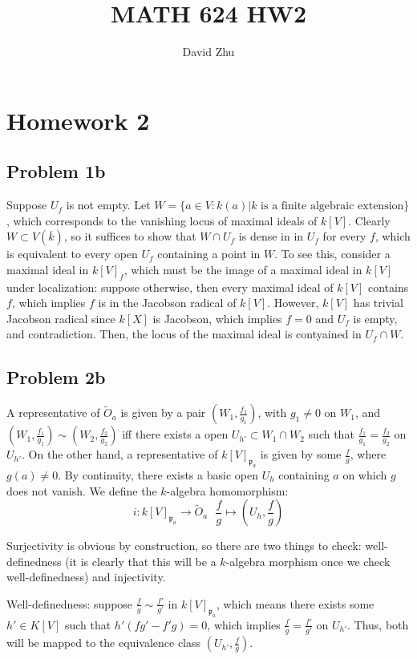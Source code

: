 \documentclass{article}
\title{MATH 624 HW2}
\author{David Zhu}
\theoremstyle{definition}
\theoremstyle{definition}
\theoremstyle{definition}
\theoremstyle{definition}
\theoremstyle{definition}
\theoremstyle{definition}
\theoremstyle{definition}
\begin{document}
\maketitle

\section*{Homework 2}

\subsection*{Problem 1b}
Suppose $U_f$ is not empty. Let $W=\{ a\in V: k(a)|k \textrm{ is a finite algebraic extension} \}$, which corresponds to the vanishing locus of maximal ideals of $k[V]$. Clearly $W\subset V(\overline{k})$, so it suffices to show that $W\cap U_f$ is dense in in $U_f$ for every $f$, which is equivalent to every open $U_f$ containing a point in $W$. To see this, consider a maximal ideal in $k[V]_f$, which must be the image of a maximal ideal in $k[V]$ under localization: suppose otherwise, then every maximal ideal of $k[V]$ contains $f$, which implies $f$ is in the Jacobson radical of $k[V]$. However, $k[V]$ has trivial Jacobson radical since $k[X]$ is Jacobson, which implies $f=0$ and $U_f$ is empty, and contradiction. Then, the locus of the maximal ideal is contyained in $U_f\cap W$.


\subsection*{Problem 2b}
A representative of $\tilde{O}_a$ is given by a pair $(W_1, \frac{f_1}{g_1})$, with $g_1\neq 0$ on $W_1$, and $(W_1, \frac{f_1}{g_1})\sim (W_2, \frac{f_2}{g_2})$ iff there exists a open $U_{h'}\subset W_1\cap W_2$ such that $\frac{f_1}{g_1}=\frac{f_2}{g_2}$ on $U_{h'}$. On the other hand, a representative of $k[V]_{\mathfrak{p}_a}$ is given by some $\frac{f}{g}$, where $g(a)\neq 0$. By continuity, there exists a basic open $U_h$ containing $a$ on which $g$ does not vanish. We define the $k$-algebra homomorphism: 
\[i: k[V]_{\mathfrak{p}_a}\to \tilde{O}_a  \ \ \ \frac{f}{g}\mapsto (U_h, \frac{f}{g})\]

Surjectivity is obvious by construction, so there are two things to check: well-definedness (it is clearly that this will be a $k$-algebra morphism once we check well-definedness) and injectivity.

Well-definedness: suppose $\frac{f}{g}\sim \frac{f'}{g'}$ in $k[V]_{\mathfrak{p}_a}$, which means there exists some $h'\in K[V]$ such that $h'(fg'-f'g)=0$, which implies $\frac{f}{g}=\frac{f'}{g'}$ on $U_{h'}$. Thus, both will be mapped to the equivalence class $(U_{h'},\frac{f}{g})$.
\end{document}
